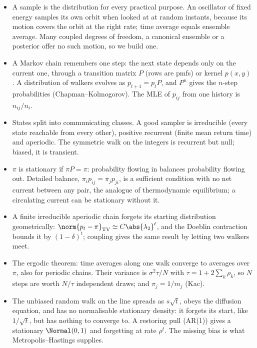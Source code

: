 \begin{recap}
\begin{itemize}
  \item A sample is the distribution for every practical purpose. An oscillator of fixed energy
        samples its own orbit when looked at at random instants, because its motion covers the
        orbit at the right rate; time average equals ensemble average. Many coupled degrees of
        freedom, a canonical ensemble or a posterior offer no such motion, so we build one.
  \item A Markov chain remembers one step: the next state depends only on the current one,
        through a transition matrix $P$ (rows are pmfs) or kernel $p(x,y)$. A distribution of
        walkers evolves as $p_{t+1}=p_tP$, and $P^n$ gives the $n$-step probabilities
        (Chapman--Kolmogorov). The MLE of $p_{ij}$ from one history is $n_{ij}/n_i$.
  \item States split into communicating classes. A good sampler is irreducible (every state
        reachable from every other), positive recurrent (finite mean return time) and aperiodic.
        The symmetric walk on the integers is recurrent but null; biased, it is transient.
  \item $\pi$ is stationary if $\pi P=\pi$: probability flowing in balances probability flowing out.
        Detailed balance, $\pi_ip_{ij}=\pi_jp_{ji}$, is a sufficient condition with no net
        current between any pair, the analogue of thermodynamic equilibrium; a circulating
        current can be stationary without it.
  \item A finite irreducible aperiodic chain forgets its starting distribution geometrically:
        $\norm{p_t-\pi}_{\rm TV}\simeq C\abs{\lambda_2}^t$, and the Doeblin contraction bounds it by
        $(1-\delta)^t$; coupling gives the same result by letting two walkers meet.
  \item The ergodic theorem: time averages along one walk converge to averages over $\pi$, also
        for periodic chains. Their variance is $\sigma^2\tau/N$ with
        $\tau=1+2\sum_k\rho_k$, so $N$ steps are worth $N/\tau$ independent draws; and
        $\pi_j=1/m_j$ (Kac).
  \item The unbiased random walk on the line spreads as $s\sqrt t$, obeys the diffusion equation,
        and has no normalisable stationary density: it forgets its start, like $1/\sqrt t$, but
        has nothing to converge to. A restoring pull (AR(1)) gives a stationary $\Normal(0,1)$
        and forgetting at rate $\rho^t$. The missing bias is what Metropolis--Hastings supplies.
\end{itemize}
\end{recap}
